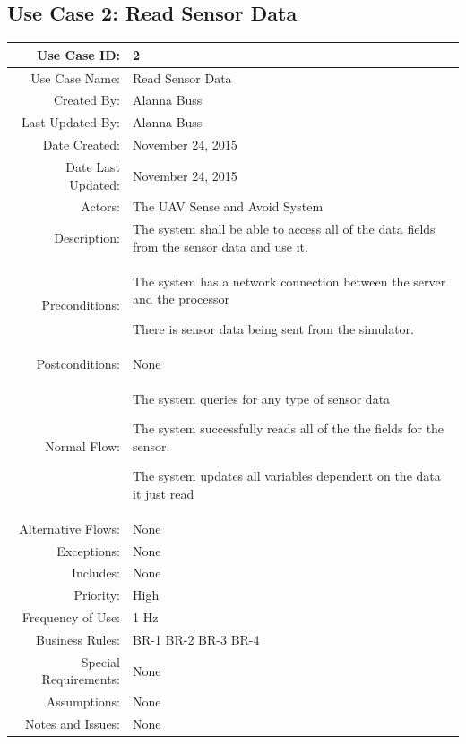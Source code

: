 \documentclass[12pt,oneside,letterpaper]{article}
\newenvironment{packed_enumerate}{ %
\vspace{-7mm}
\begin{enumerate}
  \setlength{\itemsep}{0pt}
  \setlength{\parskip}{0pt}
  \setlength{\parsep}{0pt}
}{\end{enumerate}
\vspace{-8mm}}
\begin{document}
\subsection{\label{Read data}Use Case 2: Read Sensor Data}
\begin{longtable}{|r|p{3.8in}|}
\hline
Use Case ID:&2\\
\hline
Use Case Name:&Read Sensor Data\\
\hline
Created By:&Alanna Buss\\
\hline
Last Updated By:&Alanna Buss\\
\hline
Date Created:&November 24, 2015\\
\hline
Date Last Updated:&November 24, 2015\\
\hline
Actors:&The UAV Sense and Avoid System\\
\hline
Description:&The system shall be able to access all of the data fields from the sensor data and use it.\\
\hline
Preconditions:&
\begin{packed_enumerate}
\item The system has a network connection between the server and the processor
\item There is sensor data being sent from the simulator.
\end{packed_enumerate}\\
\hline
Postconditions:&
None\\
\hline
Normal Flow:&
\begin{packed_enumerate}
\item The system queries for any type of sensor data
\item The system successfully reads all of the the fields for the sensor.
\item The system updates all variables dependent on the data it just read
\end{packed_enumerate}
\\
\hline
Alternative Flows:& None\\
\hline
Exceptions:&None \\
\hline
Includes:&None\\
\hline
Priority:&High\\
\hline
Frequency of Use:&1 Hz\\
\hline
Business Rules:&BR-1 BR-2 BR-3 BR-4\\
\hline
Special Requirements:&None\\
\hline
Assumptions:&None\\
\hline
Notes and Issues:&
None\\
\hline
\end{longtable}
\end{document}
